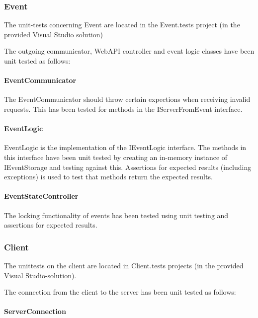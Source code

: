 \subsubsection{Event}\label{event-1}

The unit-tests concerning Event are located in the Event.tests project
(in the provided Visual Studio solution)

The outgoing communicator, WebAPI controller and event logic classes
have been unit tested as follows:

\paragraph{EventCommunicator}\label{eventcommunicator}

The EventCommunicator should throw certain expections when receiving
invalid requests. This has been tested for methods in the
IServerFromEvent interface.

\paragraph{EventLogic}\label{eventlogic}

EventLogic is the implementation of the IEventLogic interface. The
methods in this interface have been unit tested by creating an in-memory
instance of IEventStorage and testing against this. Assertions for
expected results (including exceptions) is used to test that methods
return the expected results.

\paragraph{EventStateController}\label{eventstatecontroller}

The locking functionality of events has been tested using unit testing
and assertions for expected results.

\subsubsection{Client}\label{client-1}

The unittests on the client are located in Client.tests projects (in the
provided Visual Studio-solution).

The connection from the client to the server has been unit tested as
follows:

\paragraph{ServerConnection}\label{serverconnection}


